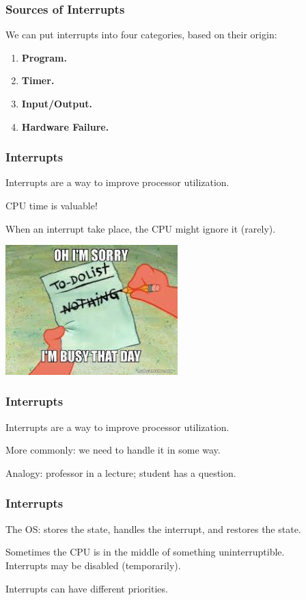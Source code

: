 \begin{frame}
\frametitle{Sources of Interrupts}

We can put interrupts into four categories, based on their origin:

\begin{enumerate}
	\item \textbf{Program.}
	\item \textbf{Timer.}
	\item \textbf{Input/Output.}
	\item \textbf{Hardware Failure.}
\end{enumerate}


\end{frame}

\begin{frame}
\frametitle{Interrupts}
Interrupts are a way to improve processor utilization.

CPU time is valuable!

When an interrupt take place, the CPU might ignore it (rarely).

\begin{center}
	\includegraphics[width=0.5\textwidth]{images/imbusy.jpg}
\end{center}

\end{frame}

\begin{frame}
\frametitle{Interrupts}
Interrupts are a way to improve processor utilization.

More commonly: we need to \alert{handle} it in some way.

Analogy: professor in a lecture; student has a question.


\end{frame}

\begin{frame}
\frametitle{Interrupts}
The OS: stores the state, handles the interrupt, and restores the state.

Sometimes the CPU is in the middle of something uninterruptible.\\
\quad Interrupts may be disabled (temporarily).

Interrupts can have different priorities.
\end{frame}

